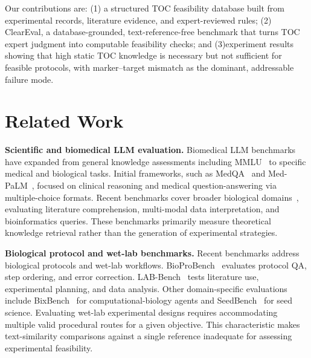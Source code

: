 \documentclass[conference]{IEEEtran}
\begin{document}
Our contributions are: (1) a structured TOC feasibility database built from
experimental records, literature evidence, and expert-reviewed rules; (2) ClearEval, 
a database-grounded, text-reference-free benchmark that turns TOC expert judgment 
into computable feasibility checks; and (3)experiment results showing that high static TOC 
knowledge is necessary but not sufficient for feasible protocols, 
with marker–target mismatch as the dominant, addressable failure mode.

\section{Related Work}\label{sec:related}

\noindent\textbf{Scientific and biomedical LLM evaluation.}
Biomedical LLM benchmarks have expanded from general knowledge assessments 
including MMLU~\cite{hendrycks2021mmlu} to specific medical and biological tasks. 
Initial frameworks, such as MedQA~\cite{jin2021disease} and
Med-PaLM~\cite{singhal2023medpalm}, focused on clinical reasoning and medical 
question-answering via multiple-choice formats. Recent benchmarks cover broader 
biological domains~\cite{zhang2025benchmarking,wang2025cardbiomedbench,feng2024mediq}, 
evaluating literature comprehension, multi-modal data interpretation, and 
bioinformatics queries. These benchmarks primarily measure theoretical knowledge 
retrieval rather than the generation of experimental strategies.

\noindent\textbf{Biological protocol and wet-lab benchmarks.}
Recent benchmarks address biological protocols and wet-lab workflows. 
BioProBench~\cite{bioprobench} evaluates protocol QA, step ordering, and error 
correction. LAB-Bench~\cite{labbench} tests literature use, experimental planning, 
and data analysis. Other domain-specific evaluations include BixBench~\cite{bixbench} 
for computational-biology agents and SeedBench~\cite{ying2025seedbench} for seed 
science. Evaluating wet-lab experimental designs requires accommodating multiple 
valid procedural routes for a given objective. This characteristic makes 
text-similarity comparisons against a single reference inadequate for assessing 
experimental feasibility.
\end{document}
